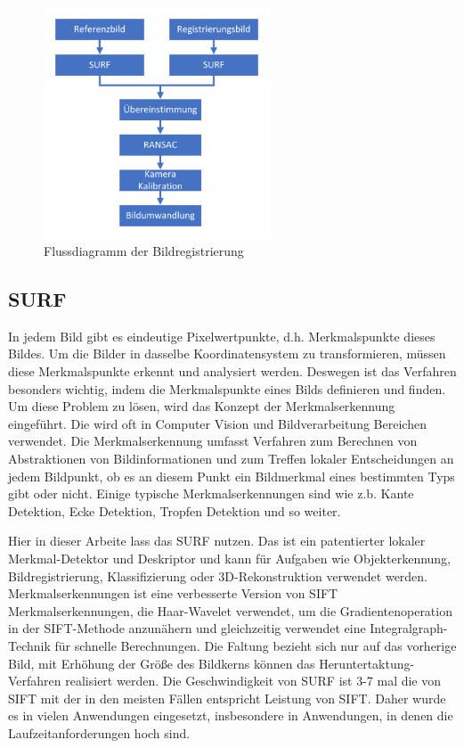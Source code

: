 \begin{figure}[H]
 \centering 
 \includegraphics[keepaspectratio,width=0.6\textwidth]{images/3_Ersteverfahren/Bildregistration.pdf}
 \caption{Flussdiagramm der Bildregistrierung}
 \label{fig:Bildregistrierung}
\end{figure}

\subsection{SURF}
In jedem Bild gibt es eindeutige Pixelwertpunkte, d.h. Merkmalspunkte dieses Bildes. Um die Bilder in dasselbe Koordinatensystem zu transformieren, müssen diese Merkmalspunkte erkennt und analysiert werden. Deswegen ist das Verfahren besonders wichtig, indem die Merkmalspunkte eines Bilds definieren und finden. Um diese Problem zu lösen, wird das Konzept der Merkmalserkennung eingeführt. Die wird oft in Computer Vision und Bildverarbeitung Bereichen verwendet. Die Merkmalserkennung umfasst Verfahren zum Berechnen von Abstraktionen von Bildinformationen und zum Treffen lokaler Entscheidungen an jedem Bildpunkt, ob es an diesem Punkt ein Bildmerkmal eines bestimmten Typs gibt oder nicht. Einige typische Merkmalserkennungen sind wie z.b. Kante Detektion, Ecke Detektion, Tropfen Detektion und so weiter.

Hier in dieser Arbeite lass das SURF \cite{Surf} nutzen. 
Das ist ein patentierter lokaler Merkmal-Detektor und Deskriptor und kann für Aufgaben wie Objekterkennung, Bildregistrierung, Klassifizierung oder 3D-Rekonstruktion verwendet werden. \cite{Surf} Merkmalserkennungen ist eine verbesserte Version von SIFT Merkmalserkennungen, die Haar-Wavelet verwendet, um die Gradientenoperation in der SIFT-Methode anzunähern und gleichzeitig verwendet eine Integralgraph-Technik für schnelle Berechnungen. Die Faltung bezieht sich nur auf das vorherige Bild, mit Erhöhung der Größe des Bildkerns können das Heruntertaktung-Verfahren realisiert werden. Die Geschwindigkeit von SURF ist 3-7 mal die von SIFT mit der in den meisten Fällen entspricht   Leistung von SIFT. Daher wurde es in vielen Anwendungen eingesetzt, insbesondere in Anwendungen, in denen die Laufzeitanforderungen hoch sind. 

